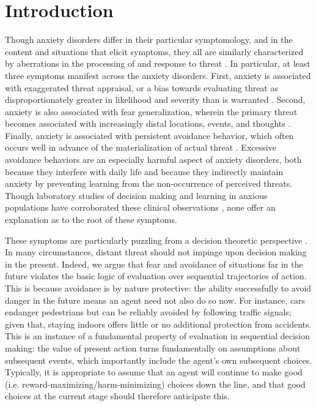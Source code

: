 \documentclass[11pt]{article} %
\begin{document}
\startmain

\section{Introduction}

Though anxiety disorders differ in their particular symptomology, and in the content and situations that elicit symptoms, they all are similarly characterized by aberrations in the processing of and response to threat \citep{dsm5}. In particular, at least three symptoms manifest across the anxiety disorders. First, anxiety is associated with exaggerated threat appraisal, or a bias towards evaluating threat as disproportionately greater in likelihood and severity than is warranted \citep{ClarkBeck2011}. Second, anxiety is also associated with fear generalization, wherein the primary threat becomes associated with increasingly distal locations, events, and thoughts \citep{dymond2015}. Finally, anxiety is associated with persistent avoidance behavior, which often occurs well in advance of the materialization of actual threat \citep{Arnaudova2017}. Excessive avoidance behaviors are an especially harmful aspect of anxiety disorders, both because they interfere with daily life and because they indirectly maintain anxiety by preventing learning from the non-occurrence of perceived threats. Though laboratory studies of decision making and learning in anxious populations have corroborated these clinical observations \citep{Harle2017, norbury2018, Aylward2019}, none offer an explanation as to the root of these symptoms.

These symptoms are particularly puzzling from a decision theoretic perspective \citep{huys2015}. In many circumstances, distant threat should not impinge upon decision making in the present. Indeed, we argue that fear and avoidance of situations far in the future violates the basic logic of evaluation over sequential trajectories of action. This is because avoidance is by nature protective: the ability successfully to avoid danger in the future means an agent need not also do so now. For instance, cars endanger pedestrians but can be reliably avoided by following traffic signals; given that, staying indoors offers little or no additional protection from accidents. This is an instance of a fundamental property of evaluation in sequential decision making: the value of present action turns fundamentally on assumptions about subsequent events, which importantly include the agent's own subsequent choices. Typically, it is appropriate to assume that an agent will continue to make good (i.e. reward-maximizing/harm-minimizing) choices down the line, and that good choices at the current stage should therefore anticipate this.
\end{document}
